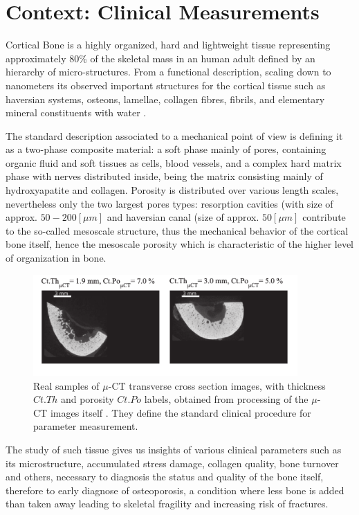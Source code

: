 \chapter{Context: Clinical Measurements}
Cortical Bone is a highly organized, hard and lightweight tissue representing approximately 80\% of the skeletal mass in an human adult defined by an hierarchy of micro-structures. From a functional description, scaling down to nanometers its observed important structures for the cortical tissue such as haversian systems, osteons, lamellae, collagen fibres, fibrils, and elementary mineral constituents with water \cite{Parnell2008}. 

The standard description associated to a mechanical point of view is defining it as a two-phase composite material: a soft phase mainly of pores, containing organic fluid and soft tissues as cells, blood vessels, and a complex hard matrix phase with nerves distributed inside, being the matrix consisting mainly of hydroxyapatite and collagen. Porosity is distributed over various length scales, nevertheless only the two largest pores types: resorption cavities (with size of approx. $50-200 [\mu m]$ and haversian canal (size of approx. $50 [ \mu m ]$ contribute to the so-called mesoscale structure, thus the mechanical behavior of the cortical bone itself, hence the mesoscale porosity which is characteristic of the higher level of organization in bone. 

\begin{figure}[!h]
	\centering
	\includegraphics[width=0.9\textwidth]{images/ImgExt/CT-ImagesTwoCases.png}
	\caption{Real samples of $\mu$-CT transverse cross section images, with thickness $Ct.Th$ and porosity $Ct.Po$ labels, obtained from processing of the $\mu$-CT images itself \cite{Minonzio2018}. They define the standard clinical procedure for parameter measurement.}
	\label{muCT-Images}
\end{figure}

The study of such tissue gives us insights of various clinical parameters such as its microstructure, accumulated stress damage, collagen quality, bone turnover and others, necessary to diagnosis the status and quality of the bone itself, therefore to early diagnose of osteoporosis, a condition where less bone is added than taken away leading to skeletal fragility and increasing risk of fractures.

